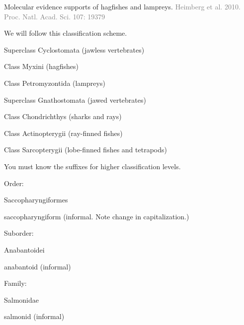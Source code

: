 \documentclass[t]{beamer}
\begin{document}
{
\begin{frame}[b,plain]{Molecular evidence supports  of hagfishes and lampreys.}
	\hfill\textcolor{gray}{Heimberg et al. 2010. Proc. Natl. Acad. Sci. 107:  19379}
\end{frame}
}


\begin{frame}[t,plain]{We will follow this classification scheme.}

	\hspace{5em} Superclass Cyclostomata (jawless vertebrates)

	\hspace{6em} Class Myxini (hagfishes)

	\hspace{6em} Class Petromyzontida (lampreys)

	\hspace{5em} Superclass Gnathostomata (jawed vertebrates)

	\hspace{6em} Class Chondrichthys (sharks and rays)

	\hspace{6em} Class Actinopterygii (ray-finned fishes)

	\hspace{6em} Class Sarcopterygii (lobe-finned fishes and tetrapods)
	
\end{frame}

\begin{frame}[t,plain]{You must know the suffixes for higher classification levels.}

	\hangpara Order: 
	
	\hspace{2em} Saccopharyngiformes
	
	\hspace{2em} saccopharyngiform (informal. Note change in capitalization.)

	\hangpara Suborder: 
	
	\hspace{2em} Anabantoidei
	
	\hspace{2em} anabantoid (informal)
	
	\hangpara Family: 
	
	\hspace{2em} Salmonidae
	
	\hspace{2em} salmonid (informal)
	
\end{frame}
\end{document}
